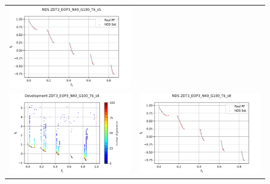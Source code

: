 \begin{figure}[H]
\begin{tabular}{c c}
    \includegraphics[scale=0.5]{figures/ZDT3_EOP3_N40_G100_T6/s5_nds.png}\\
    \includegraphics[scale=0.5]{figures/ZDT3_EOP3_N40_G100_T6/s8_dev.png} &
    \includegraphics[scale=0.5]{figures/ZDT3_EOP3_N40_G100_T6/s8_nds.png}\\

\end{tabular}
\end{figure}
